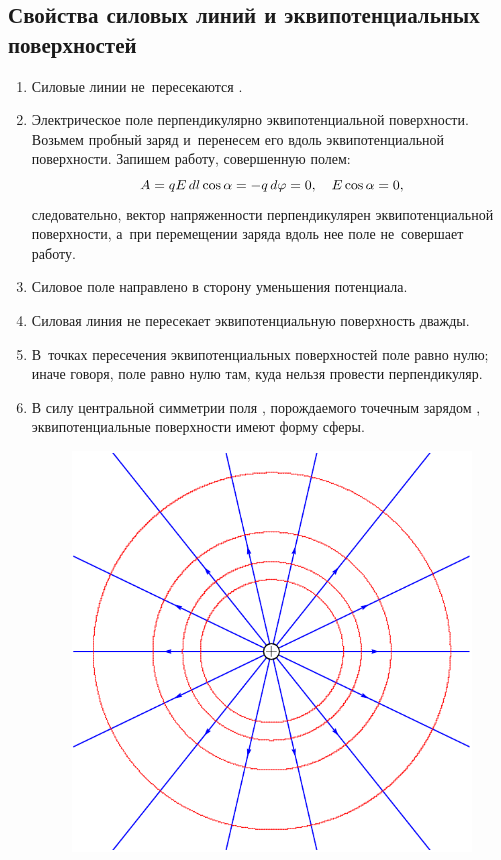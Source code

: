 	\subsection{Свойства силовых линий и эквипотенциальных поверхностей}
		\begin{enumerate}
			\item Силовые линии не~пересекаются .
			\item Электрическое поле  перпендикулярно эквипотенциальной поверхности. Возьмем пробный заряд  и~перенесем его вдоль эквипотенциальной поверхности. Запишем работу, совершенную полем:
				$$A=qE\,d l\cos{\alpha}=-q\,d \varphi = 0, \quad E\cos{\alpha}=0,$$
				следовательно, вектор напряженности  перпендикулярен эквипотенциальной поверхности, а~при перемещении заряда вдоль нее поле не~совершает работу.
			\item Силовое поле направлено в сторону уменьшения потенциала.
			\item Силовая линия  не пересекает эквипотенциальную поверхность дважды.
			\item В~точках пересечения эквипотенциальных поверхностей поле равно нулю; иначе говоря, поле равно нулю там, куда нельзя провести перпендикуляр.
			\item В силу центральной симметрии поля , порождаемого точечным зарядом , эквипотенциальные поверхности имеют форму сферы.
					\begin{figure}[h!]
						\centering
						\includegraphics[scale=0.75]{./img/fig14/fig14.pdf}

\end{figure}
\end{enumerate}
